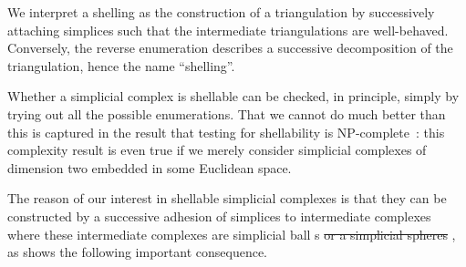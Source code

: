 \documentclass[10pt,letterpaper]{article}
\newcommand\cye[1]{%
  \protect\leavevmode
  \begingroup
    \color{red!35!yellow}%
    #1%
  \endgroup
}
\newcommand{\disk}{\cye{ball}}
\begin{document}
\begin{remark}
    We interpret a shelling as the construction of a triangulation 
    by successively attaching simplices such that the intermediate triangulations are well-behaved. 
    Conversely, the reverse enumeration describes a successive decomposition of the triangulation, hence the name ``shelling''.
\end{remark}
\begin{remark}
    Whether a simplicial complex is shellable can be checked, in principle, simply by trying out all the possible enumerations.
    That we cannot do much better than this is captured in the result that testing for shellability is NP-complete~\cite{goaoc2019shellability}:
    this complexity result is even true if we merely consider simplicial complexes of dimension two embedded in some Euclidean space.
\end{remark}


The reason of our interest in shellable simplicial complexes is that they can be constructed by \cye{a} successive adhesion of simplices to intermediate complexes \cye{where these intermediate complexes are} simplicial \disk s \cye{\sout{or a simplicial spheres}}, as shows the following important consequence. 
\end{document}
